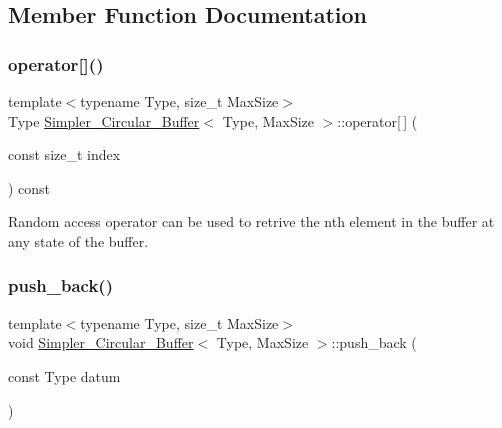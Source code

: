 \subsection{Member Function Documentation}
\mbox{\label{classSimpler__Circular__Buffer_a4ce53bc8ad0d231e9d013c771191696a}} 
\subsubsection{\texorpdfstring{operator[]()}{operator[]()}}
{\footnotesize\ttfamily template$<$typename Type, size\+\_\+t Max\+Size$>$ \\
Type \hyperlink{classSimpler__Circular__Buffer}{Simpler\+\_\+\+Circular\+\_\+\+Buffer}$<$ Type, Max\+Size $>$\+::operator\mbox{[}$\,$\mbox{]} (\begin{DoxyParamCaption}\item[{const size\+\_\+t}]{index }\end{DoxyParamCaption}) const\hspace{0.3cm}{\ttfamily [inline]}}



Random access operator can be used to retrive the nth element in the buffer at any state of the buffer. 

\mbox{\label{classSimpler__Circular__Buffer_af4bdd0a6d3fc7a8c06f62b0d996158f0}} 
\subsubsection{\texorpdfstring{push\+\_\+back()}{push\_back()}}
{\footnotesize\ttfamily template$<$typename Type, size\+\_\+t Max\+Size$>$ \\
void \hyperlink{classSimpler__Circular__Buffer}{Simpler\+\_\+\+Circular\+\_\+\+Buffer}$<$ Type, Max\+Size $>$\+::push\+\_\+back (\begin{DoxyParamCaption}\item[{const Type}]{datum }\end{DoxyParamCaption})\hspace{0.3cm}{\ttfamily [inline]}}



